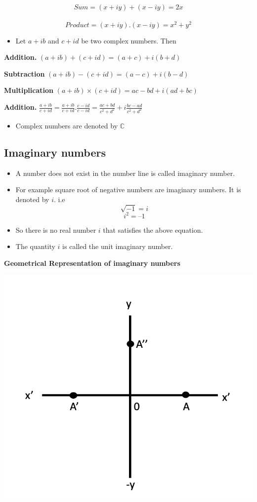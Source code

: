\documentclass[]{book}
\providecommand{\tightlist}{%
  \setlength{\itemsep}{0pt}\setlength{\parskip}{0pt}}
\begin{document}
\[Sum = (x+iy)+(x-iy) = 2x\]\\
\[Product = (x+iy).(x-iy) = x^{2}+y^{2}\]

\begin{itemize}
\tightlist
\item
  Let \(a+ib\) and \(c+id\) be two complex numbers. Then
\end{itemize}

\textbf{Addition.} \((a+ib) + (c+id)= (a+c)+i(b+d)\)

\textbf{Subtraction} \((a+ib) - (c+id)= (a-c)+i(b-d)\)

\textbf{Multiplication} \((a+ib) \times (c+id)= ac-bd+i(ad+bc)\)

\textbf{Addition.} \(\frac{a+ib}{c+id}= \frac{a+ib}{c+id}.\frac{c-id}{c-id}= \frac{ac+bd}{c^2+d^2}+i\frac{bc-ad}{c^2+d^2}\)

\begin{itemize}
\tightlist
\item
  Complex numbers are denoted by \(\mathbb{C}\)
\end{itemize}

\hypertarget{imaginary-numbers}{%
\subsection{Imaginary numbers}\label{imaginary-numbers}}

\begin{itemize}
\tightlist
\item
  A number does not exist in the number line is called imaginary number.
\item
  For example square root of negative numbers are imaginary numbers. It is denoted by \(i\).
  i.e \[\sqrt{-1}=i\] \newline
  \[i^{2} = – 1\]
\item
  So there is no real number \(i\) that satisfies the above equation.
\item
  The quantity \(i\) is called the unit imaginary number.
\end{itemize}

\textbf{Geometrical Representation of imaginary numbers}

\begin{center}\includegraphics[width=0.5\linewidth]{figure/1-ImgNum} \end{center}
\end{document}
